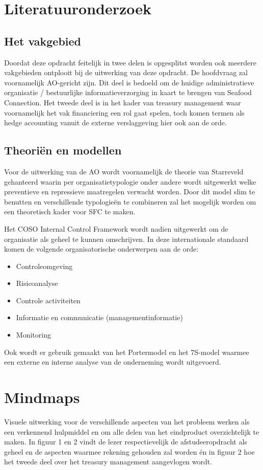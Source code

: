 \documentclass[10pt,a4paper,twoside]{report}
\begin{document}
\chapter{Literatuuronderzoek}
\section{Het vakgebied}
Doordat deze opdracht feitelijk in twee delen is opgesplitst worden ook meerdere vakgebieden ontplooit bij de uitwerking van deze opdracht. De hoofdvraag zal voornamelijk AO-gericht zijn. Dit deel is bedoeld om de huidige administratieve organisatie / bestuurlijke informatieverzorging in kaart te brengen van Seafood Connection. Het tweede deel is in het kader van treasury management waar voornamelijk het vak financiering een rol gaat spelen, toch komen termen als hedge accounting vanuit de externe verslaggeving hier ook aan de orde.

\section{Theoriën en modellen}
Voor de uitwerking van de AO wordt voornamelijk de theorie van Starreveld gehanteerd waarin per organisatietypologie onder andere wordt uitgewerkt welke preventieve en repressieve maatregelen verwacht worden. Door dit model slim te benutten en verschillende typologieën te combineren zal het mogelijk worden om een theoretisch kader voor SFC te maken. 

Het COSO Internal Control Framework wordt nadien uitgewerkt om de organisatie als geheel te kunnen omschrijven. In deze internationale standaard komen de volgende organisatorische onderwerpen aan de orde:
\begin{itemize}
    \item Controleomgeving
    \item Risicoanalyse
    \item Controle activiteiten
    \item Informatie en communicatie (managementinformatie)
    \item Monitoring
\end{itemize}
Ook wordt er gebruik gemaakt van het Portermodel en het 7S-model waarmee een externe en interne analyse van de onderneming wordt uitgevoerd.

\chapter{Mindmaps}
Visuele uitwerking voor de verschillende aspecten van het probleem werken als een verkennend hulpmiddel en om alle delen van het eindproduct overzichtelijk te maken. In figuur 1 en 2 vindt de lezer respectievelijk de afstudeeropdracht als geheel en de aspecten waarmee rekening gehouden zal worden én in figuur 2 hoe het tweede deel over het treasury management aangevlogen wordt. 
\end{document}
